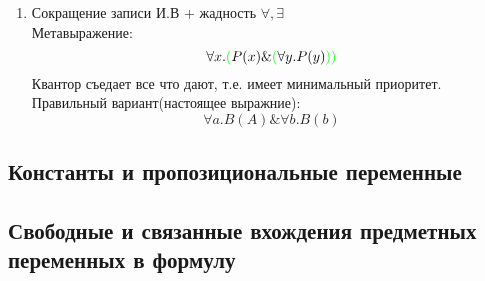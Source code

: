 \documentclass[english]{article}
\theoremstyle{plain}
\theoremstyle{remark}
\theoremstyle{definition}
\begin{document}
\begin{enumerate}
\item Сокращение записи
\label{sec:orgb986c94}
И.В + жадность \(\forall, \exists\) \\
Метавыражение:
\[ \forall x. \color{green}(\color{black}P(x) \& \color{green}(\color{black}\forall y. P(y) \color{green}))\color{black} \]
Квантор съедает все что дают, т.е. имеет минимальный приоритет. \\
Правильный вариант(настоящее выражние):
\[ \forall a. B(A) \& \forall b. B(b) \]
\end{enumerate}
\subsection{Константы и пропозициональные переменные}
\label{sec:org4e729d8}
\subsection{Свободные и связанные вхождения предметных переменных в формулу}
\label{sec:orgff8a1b5}
\end{document}
